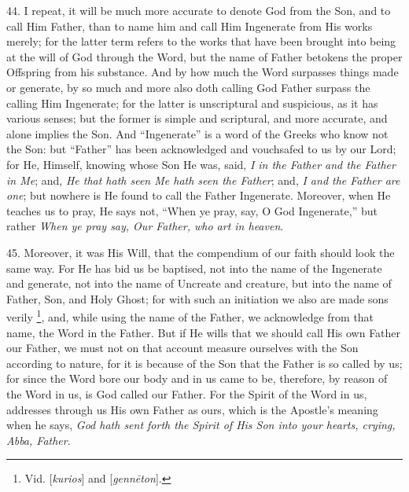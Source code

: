 44. I repeat, it will be much
more accurate to denote God from the Son, and to call Him Father, than
to name him and call Him Ingenerate from His works merely; for the
latter term refers to the works that have been brought into being at
the will of God through the Word, but the name of Father betokens the
proper Offspring from his substance. And by how much the Word
surpasses things made or generate, by so much and more also doth
calling God Father surpass the calling Him Ingenerate; for the latter
is unscriptural and suspicious, as it has various senses; but the
former is simple and scriptural, and more accurate, and alone implies
the Son. And ``Ingenerate'' is a word of the Greeks who know not the
Son: but ``Father'' has been acknowledged and vouchsafed to us by our
Lord; for He, Himself, knowing whose Son He was, said, \emph{I in the
Father and the Father in Me}; and, \emph{He that hath seen Me hath
seen the Father}; and, \emph{I and the Father are one}; but nowhere
is He found to call the Father Ingenerate. Moreover, when He teaches
us to pray, He says not, ``When ye pray, say, O God Ingenerate,'' but
rather \emph{When ye pray say, Our Father, who art in heaven}.

45. Moreover, it was His Will,
that the compendium of our faith should look the same way. For He has
bid us be baptised, not into the name of the Ingenerate and generate,
not into the name of Uncreate and creature, but into the name of
Father, Son, and Holy Ghost; for with such an initiation we also
are made sons verily \footnote{Vid. [\emph{kurios}] and [\emph{genn\={e}ton}].},
and, while using the name of the Father, we acknowledge from that
name, the Word in the Father. But if He wills that we should call His
own Father our Father, we must not on that account measure ourselves
with the Son according to nature, for it is because of the Son that
the Father is so called by us; for since the Word bore our body and in
us came to be, therefore, by reason of the Word in us, is God called
our Father. For the Spirit of the Word in us, addresses through us His
own Father as ours, which is the Apostle's meaning when he says, \emph{God
hath sent forth the Spirit of His Son into your hearts, crying, Abba,
Father}.

